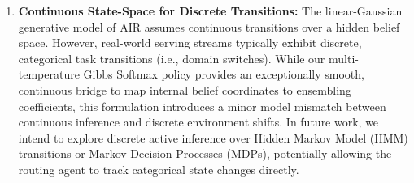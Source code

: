 \documentclass{article}
\theoremstyle{plain}
\theoremstyle{definition}
\theoremstyle{remark}
\begin{document}
\begin{enumerate}
    \item \textbf{Continuous State-Space for Discrete Transitions:} The linear-Gaussian generative model of AIR assumes continuous transitions over a hidden belief space. However, real-world serving streams typically exhibit discrete, categorical task transitions (i.e., domain switches). While our multi-temperature Gibbs Softmax policy provides an exceptionally smooth, continuous bridge to map internal belief coordinates to ensembling coefficients, this formulation introduces a minor model mismatch between continuous inference and discrete environment shifts. In future work, we intend to explore discrete active inference over Hidden Markov Model (HMM) transitions or Markov Decision Processes (MDPs), potentially allowing the routing agent to track categorical state changes directly.


\end{enumerate}
\end{document}

